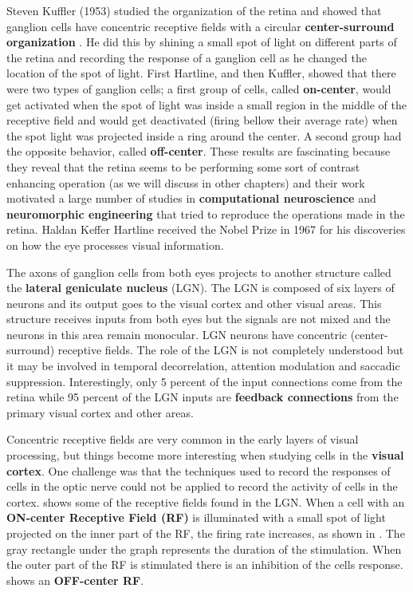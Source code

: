 Steven Kuffler (1953) studied the organization of the retina and showed that ganglion cells have concentric receptive fields with a circular {\bf center-surround organization} \cite{Kuffler1953}.
He did this by shining a small spot of light on different parts of the retina and recording the response of a ganglion cell as he changed the location of the spot of light. First Hartline, and then Kuffler, showed that there were two types of ganglion cells; a first group of cells, called {\bf on-center}, would get activated when the spot of light was inside a small region in the middle of the receptive field and would get deactivated (firing bellow their average rate) when the spot light was projected inside a ring around the center.
A second group had the opposite behavior, called {\bf off-center}. These results are fascinating because they reveal that the retina seems to be performing some sort of contrast enhancing operation (as we will discuss in other chapters) and their work motivated a large number of studies in {\bf computational neuroscience} and {\bf neuromorphic engineering} \cite{Mead89} that tried to reproduce the operations made in the retina. Haldan Keffer Hartline received the Nobel Prize in 1967 for his discoveries on how the eye processes visual information.


The axons of ganglion cells from both eyes projects to another structure called the {\bf lateral geniculate nucleus} (LGN). The LGN is composed of six layers of neurons and its output goes to the visual cortex and other visual areas. This structure receives inputs from both eyes but the signals are not mixed and the neurons in this area remain monocular. LGN neurons have concentric (center-surround) receptive fields. The role of the LGN is not completely understood but it may be involved in temporal decorrelation, attention modulation and saccadic suppression. Interestingly, only 5 percent of the input connections come from the retina while 95 percent of the LGN inputs are {\bf feedback connections} from the primary visual cortex and other areas.


Concentric receptive fields are very common in the early layers of visual processing, but things become more interesting when studying cells in the {\bf visual cortex}. One challenge was that the techniques used to record the responses of cells in the optic nerve could not be applied to record the activity of cells in the cortex. \Fig{\ref{fig:receptivefields}} shows some of the receptive fields found in the LGN. When a cell with an {\bf ON-center Receptive Field (RF)} is illuminated with a small spot of light projected on the inner part of the RF, the firing rate increases, as shown in . The gray rectangle under the graph represents the duration of the stimulation. When the outer part of the RF is stimulated there is an inhibition of the cells response.  shows an {\bf OFF-center RF}.


